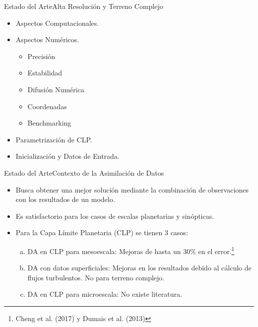 \documentclass[mathserif,10pt]{beamer}
\begin{document}
\begin{frame}{Estado del Arte}{Alta Resolución y Terreno Complejo}
	\begin{itemize}
		\item Aspectos Computacionales.
		\item Aspectos Numéricos.
		\begin{itemize}
			\item Precisión
			\item Estabilidad
			\item Difusión Numérica
			\item Coordenadas
			\item Benchmarking
		\end{itemize}
		\item Parametrización de CLP.
		\item Inicialización y Datos de Entrada.
	\end{itemize}
\end{frame}

\begin{frame}{Estado del Arte}{Contexto de la Asimilación de Datos}
	\begin{itemize}
		\item Busca obtener una mejor solución mediante la combinación de observaciones con los resultados de un modelo.
		\item Es satisfactorio para los casos de escalas planetarias y sinópticas.
		\item Para la Capa Límite Planetaria (CLP) se tienen 3 casos:
		\begin{enumerate}[a.]
			\item DA en CLP para mesoescala: Mejoras de hasta un 30\% en el error.\footnote{Cheng et al. (2017) y Dumais et al. (2013)}
			\item DA con datos superficiales: Mejoras en los resultados debido al cálculo de flujos turbulentos. No para terreno complejo.
			\item DA en CLP para microescala: No existe literatura.
		\end{enumerate}
	\end{itemize}
\end{frame}












\end{document}
